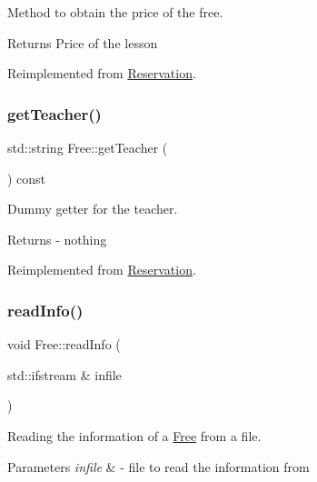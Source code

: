 Method to obtain the price of the free. 

\begin{DoxyReturn}{Returns}
Price of the lesson 
\end{DoxyReturn}


Reimplemented from \mbox{\hyperlink{class_reservation_a62cdb2f1a24e2fce92fb9f024ae9f494}{Reservation}}.

\mbox{\label{class_free_a785a58afc51a7b1920e7b2a96ff9ca52}} 
\subsubsection{\texorpdfstring{get\+Teacher()}{getTeacher()}}
{\footnotesize\ttfamily std\+::string Free\+::get\+Teacher (\begin{DoxyParamCaption}{ }\end{DoxyParamCaption}) const\hspace{0.3cm}{\ttfamily [virtual]}}



Dummy getter for the teacher. 

\begin{DoxyReturn}{Returns}
-\/ nothing 
\end{DoxyReturn}


Reimplemented from \mbox{\hyperlink{class_reservation}{Reservation}}.

\mbox{\label{class_free_ad1023c825c9790edf0797e2e69dd2fcf}} 
\subsubsection{\texorpdfstring{read\+Info()}{readInfo()}}
{\footnotesize\ttfamily void Free\+::read\+Info (\begin{DoxyParamCaption}\item[{std\+::ifstream \&}]{infile }\end{DoxyParamCaption})\hspace{0.3cm}{\ttfamily [virtual]}}



Reading the information of a \mbox{\hyperlink{class_free}{Free}} from a file. 


\begin{DoxyParams}{Parameters}
{\em infile} & -\/ file to read the information from \\
\hline
\end{DoxyParams}


